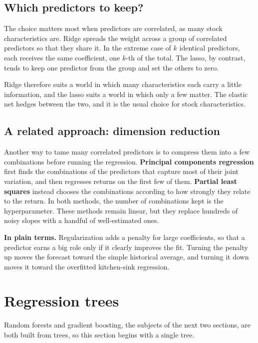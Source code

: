 \subsection{Which predictors to keep?}

The choice matters most when predictors are correlated, as many stock characteristics are. Ridge spreads the weight across a group of correlated predictors so that they share it. In the extreme case of $k$ identical predictors, each receives the same coefficient, one $k$-th of the total. The lasso, by contrast, tends to keep one predictor from the group and set the others to zero.

Ridge therefore suits a world in which many characteristics each carry a little information, and the lasso suits a world in which only a few matter. The elastic net hedges between the two, and it is the usual choice for stock characteristics.

\subsection{A related approach: dimension reduction}

Another way to tame many correlated predictors is to compress them into a few combinations before running the regression. \textbf{Principal components regression} first finds the combinations of the predictors that capture most of their joint variation, and then regresses returns on the first few of them. \textbf{Partial least squares} instead chooses the combinations according to how strongly they relate to the return. In both methods, the number of combinations kept is the hyperparameter. These methods remain linear, but they replace hundreds of noisy slopes with a handful of well-estimated ones.

\noindent\textbf{In plain terms.} Regularization adds a penalty for large coefficients, so that a predictor earns a big role only if it clearly improves the fit. Turning the penalty up moves the forecast toward the simple historical average, and turning it down moves it toward the overfitted kitchen-sink regression.

\section{Regression trees}
\label{sec:20-trees}

Random forests and gradient boosting, the subjects of the next two sections, are both built from trees, so this section begins with a single tree.

